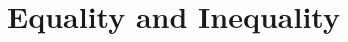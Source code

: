 \ifdefined\inmaster\else\def\subonly{\jobname}\fi

\chapter{Equality and Inequality}
\label{sec:equality}

